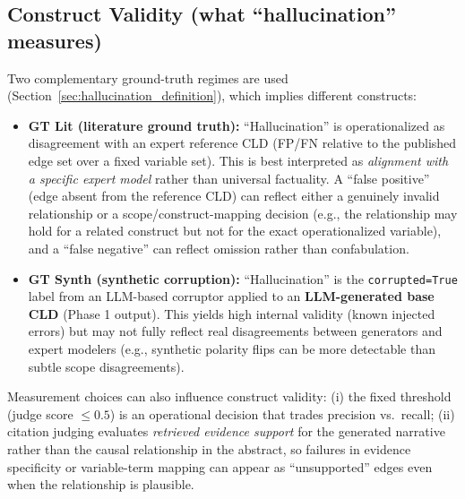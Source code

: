 \subsection{Construct Validity (what ``hallucination'' measures)}
Two complementary ground-truth regimes are used (Section~\ref{sec:hallucination_definition}), which implies different constructs:
\begin{itemize}[noitemsep]
    \item[] \textbf{GT Lit (literature ground truth):} ``Hallucination'' is operationalized as disagreement with an expert reference CLD (FP/FN relative to the published edge set over a fixed variable set). This is best interpreted as \textit{alignment with a specific expert model} rather than universal factuality. A ``false positive'' (edge absent from the reference CLD) can reflect either a genuinely invalid relationship or a scope/construct-mapping decision (e.g., the relationship may hold for a related construct but not for the exact operationalized variable), and a ``false negative'' can reflect omission rather than confabulation.
    \item[] \textbf{GT Synth (synthetic corruption):} ``Hallucination'' is the \texttt{corrupted=True} label from an LLM-based corruptor applied to an \textbf{LLM-generated base CLD} (Phase 1 output). This yields high internal validity (known injected errors) but may not fully reflect real disagreements between generators and expert modelers (e.g., synthetic polarity flips can be more detectable than subtle scope disagreements).
\end{itemize}
Measurement choices can also influence construct validity: (i) the fixed threshold (judge score $\le 0.5$) is an operational decision that trades precision vs.\ recall; (ii) citation judging evaluates \textit{retrieved evidence support} for the generated narrative rather than the causal relationship in the abstract, so failures in evidence specificity or variable-term mapping can appear as ``unsupported'' edges even when the relationship is plausible.

